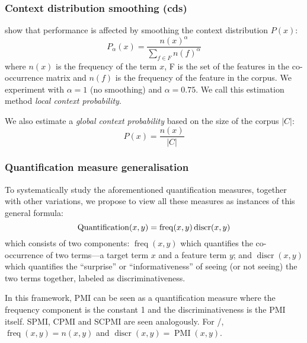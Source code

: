 \subsubsection{Context distribution smoothing (cds)}
\label{sec:cont-distr-smooth}

 show that performance is affected by smoothing the context distribution $P(x)$:
%
\begin{equation}
  \label{eq:cds}
  P_{\alpha}(x) = \frac{n(x)^{\alpha}}{\sum_{f \in F}n(f)^{\alpha}}
\end{equation}
where $n(x)$ is the frequency of the term $x$, F is the set of the features in the co-occurrence matrix and $n(f)$ is the frequency of the feature in the corpus. We experiment with $\alpha=1$ (no smoothing) and $\alpha = 0.75$. We call this estimation method \emph{local context probability}.

We also estimate a \emph{global context probability} based on the size of the corpus $|C|$:
%
\begin{equation}
  \label{eq:cds-nan}
  P(x) = \frac{n(x)}{|C|}
\end{equation}

\subsubsection{Quantification measure generalisation}
\label{sec:quantification-measures}

To systematically study the aforementioned quantification measures, together with other variations, we propose to view all these measures as instances of this general formula:
%
\begin{equation}
  \small
  \label{eq:association}
  \operatorname{Quantification}(x,y) = \operatorname{freq}(x, y)
                                       \operatorname{discr}(x, y)
\end{equation}
%
which consists of two components: $\operatorname{freq}(x, y)$ which quantifies the co-occurrence of two terms---a target term $x$ and a feature term $y$; and $\operatorname{discr}(x, y)$ which quantifies the ``surprise'' or ``informativeness'' of seeing (or not seeing) the two terms together, labeled as discriminativeness.

In this framework, PMI can be seen as a quantification measure where the frequency component is the constant 1 and the discriminativeness is the PMI itself. SPMI, CPMI and SCPMI are seen analogously. For \NPMI/, $\operatorname{freq}(x, y) = n(x, y)$ and $\operatorname{discr}(x, y) = \operatorname{PMI}(x, y)$.

